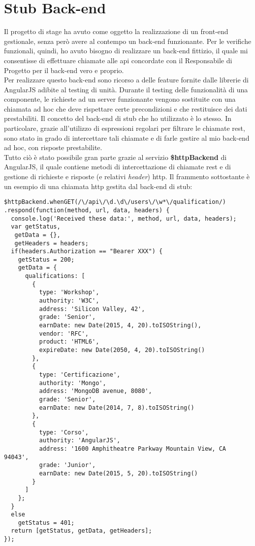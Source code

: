 \section{Stub Back-end}
Il progetto di stage ha avuto come oggetto la realizzazione di un \gls{front-end} gestionale, senza però avere al contempo un \gls{back-end} funzionante. Per le verifiche funzionali, quindi, ho avuto bisogno di realizzare un \gls{back-end} fittizio, il quale mi consentisse di effettuare chiamate alle \gls{api} concordate con il Responsabile di Progetto per il \gls{back-end} vero e proprio.\\
Per realizzare questo \gls{back-end} sono ricorso a delle feature fornite dalle librerie di AngularJS adibite al testing di unità. Durante il testing delle funzionalità di una componente, le richieste ad un server funzionante vengono sostituite con una chiamata ad hoc che deve rispettare certe precondizioni e che restituisce dei dati prestabiliti. Il concetto del \gls{back-end} di \gls{stub} che ho utilizzato è lo stesso. In particolare, grazie all'utilizzo di espressioni regolari per filtrare le chiamate \gls{rest}, sono stato in grado di intercettare tali chiamate e di farle gestire al mio \gls{back-end} ad hoc, con risposte prestabilite.\\
Tutto ciò è stato possibile gran parte grazie al servizio \textbf{\$httpBackend} di AngularJS, il quale contiene metodi di intercettazione di chiamate \gls{rest} e di gestione di richieste e risposte (e relativi \emph{header}) \gls{http}. Il frammento sottostante è un esempio di una chiamata \gls{http} gestita dal \gls{back-end} di \gls{stub}:

\begin{verbatim}
$httpBackend.whenGET(/\/api\/\d.\d\/users\/\w*\/qualification/)
.respond(function(method, url, data, headers) {
  console.log('Received these data:', method, url, data, headers);
  var getStatus,
   getData = {},
   getHeaders = headers;
  if(headers.Authorization == "Bearer XXX") {
    getStatus = 200;
    getData = {
      qualifications: [
        {
          type: 'Workshop',
          authority: 'W3C',
          address: 'Silicon Valley, 42',
          grade: 'Senior',
          earnDate: new Date(2015, 4, 20).toISOString(),
          vendor: 'RFC',
          product: 'HTML6',
          expireDate: new Date(2050, 4, 20).toISOString()
        },
        {
          type: 'Certificazione',
          authority: 'Mongo',
          address: 'MongoDB avenue, 8080',
          grade: 'Senior',
          earnDate: new Date(2014, 7, 8).toISOString()
        },
        {
          type: 'Corso',
          authority: 'AngularJS',
          address: '1600 Amphitheatre Parkway Mountain View, CA 94043',
          grade: 'Junior',
          earnDate: new Date(2015, 5, 20).toISOString()
        }
      ]
    };
  }
  else
    getStatus = 401;
  return [getStatus, getData, getHeaders];
});
\end{verbatim} 

